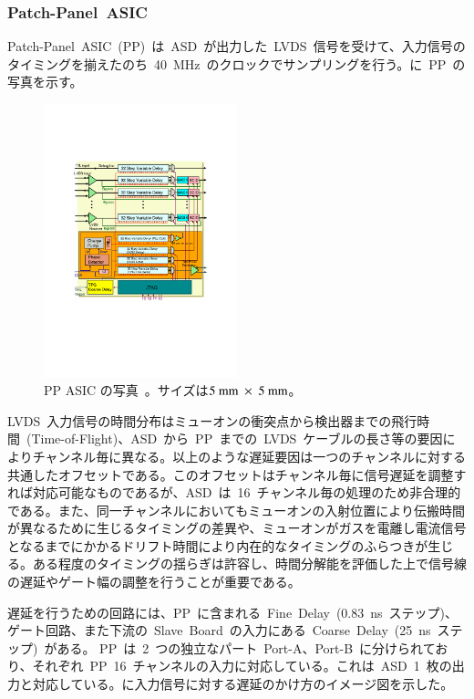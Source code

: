\subsubsection{Patch-Panel~ASIC}
Patch-Panel~ASIC~(PP)~は~ASD~が出力した~LVDS~信号を受けて、入力信号のタイミングを揃えたのち~40~MHz~のクロックでサンプリングを行う。に~PP~の写真を示す。

\begin{figure}[H]
        \centering   
        \includegraphics[width=0.5\textwidth,page=2]{img/pdf/PP.pdf}
        \caption[PP ASIC の写真]{PP ASIC の写真~\cite{URL:05}。サイズは$5~\rm{mm}~\times~5~\rm{mm}$。}
        \label{fig:PPphoto}
\end{figure}

LVDS~入力信号の時間分布はミューオンの衝突点から検出器までの飛行時間~(Time-of-Flight)、ASD~から~PP~までの~LVDS~ケーブルの長さ等の要因によりチャンネル毎に異なる。以上のような遅延要因は一つのチャンネルに対する共通したオフセットである。このオフセットはチャンネル毎に信号遅延を調整すれば対応可能なものであるが、ASD~は~16~チャンネル毎の処理のため非合理的である。また、同一チャンネルにおいてもミューオンの入射位置により伝搬時間が異なるために生じるタイミングの差異や、ミューオンがガスを電離し電流信号となるまでにかかるドリフト時間により内在的なタイミングのふらつきが生じる。ある程度のタイミングの揺らぎは許容し、時間分解能を評価した上で信号線の遅延やゲート幅の調整を行うことが重要である。

遅延を行うための回路には、PP~に含まれる~Fine~Delay~(0.83~ns~ステップ)、ゲート回路、また下流の~Slave~Board~の入力にある~Coarse~Delay~(25~ns~ステップ)~がある。
PP~は~2~つの独立なパート~Port-A、Port-B~に分けられており、それぞれ~PP~16~チャンネルの入力に対応している。これは~ASD~1~枚の出力と対応している。に入力信号に対する遅延のかけ方のイメージ図を示した。

